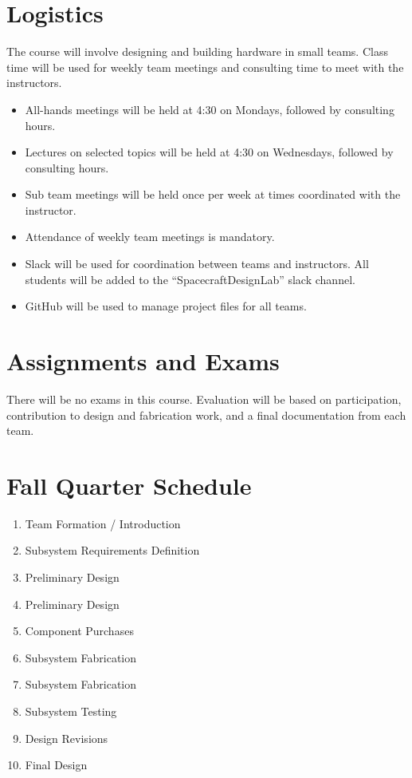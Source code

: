 \documentclass[11pt,letterpaper]{article}
\begin{document}
\section*{Logistics}

The course will involve designing and building hardware in small teams. Class time will be used for weekly team meetings and consulting time to meet with the instructors.

\begin{itemize}
	\item All-hands meetings will be held at 4:30 on Mondays, followed by consulting hours.
	\item Lectures on selected topics will be held at 4:30 on Wednesdays, followed by consulting hours.
	\item Sub team meetings will be held once per week at times coordinated with the instructor.
	\item Attendance of weekly team meetings is mandatory.
	\item Slack will be used for coordination between teams and instructors. All students will be added to the ``SpacecraftDesignLab'' slack channel.
	\item GitHub will be used to manage project files for all teams.
\end{itemize}

\section*{Assignments and Exams}

There will be no exams in this course. Evaluation will be based on participation, contribution to design and fabrication work, and a final documentation from each team.

\section*{Fall Quarter Schedule}

\begin{enumerate}[label=\textbf{Week \arabic*:},leftmargin=3.5\parindent]
	\item Team Formation / Introduction
	\item Subsystem Requirements Definition
	\item Preliminary Design
	\item Preliminary Design
	\item Component Purchases
	\item Subsystem Fabrication
	\item Subsystem Fabrication
	\item Subsystem Testing
	\item Design Revisions
	\item Final Design
\end{enumerate}
\end{document}
